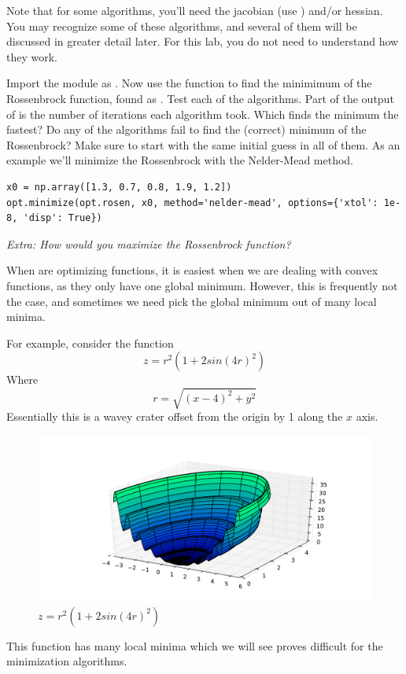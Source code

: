 Note that for some algorithms, you'll need the jacobian (use ) and/or hessian.
You may recognize some of these algorithms, and several of them will be discussed in greater detail later. For this lab, you do not need to understand how they work.

\begin{problem}

Import the  module as . Now use the  function to find the minimimum of the Rossenbrock function, found as . Test each of the algorithms. Part of the output of  is the number of iterations each algorithm took. Which finds the minimum the fastest? Do any of the algorithms fail to find the (correct) minimum of the Rossenbrock?
Make sure to start with the same initial guess in all of them. As an example we'll minimize the Rossenbrock with the Nelder-Mead method.

\begin{lstlisting}
x0 = np.array([1.3, 0.7, 0.8, 1.9, 1.2])
opt.minimize(opt.rosen, x0, method='nelder-mead', options={'xtol': 1e-8, 'disp': True})
\end{lstlisting}

\emph{Extra: How would you maximize the Rossenbrock function?}
\end{problem}

When are optimizing functions, it is easiest when we are dealing with convex functions, as they only have one global minimum. However, this is frequently not the case, and sometimes we need pick the global minimum out of many local minima.

For example, consider the function
\[
z = r^2 (1+ 2sin(4r)^2)
\]
Where
\[
r = \sqrt{(x-4)^2 + y^2}
\]
Essentially this is a wavey crater offset from the origin by 1 along the $x$ axis.
\begin{figure}
\includegraphics[width=\textwidth]{ManyMinima.pdf}
\caption{$z = r^2 (1+ 2sin(4r)^2)$}
\label{opt:muiltmin}
\end{figure}
This function has many local minima which we will see proves difficult for the minimization algorithms.

